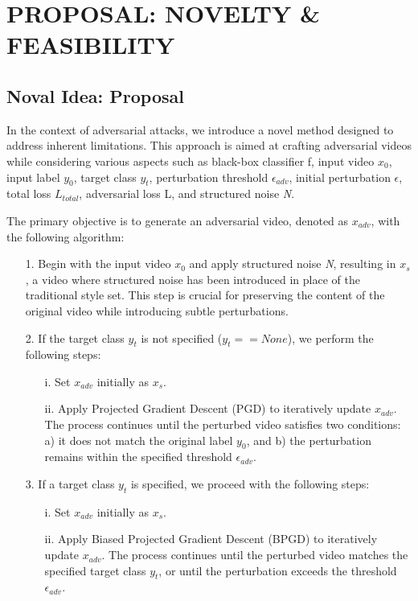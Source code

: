 \section {PROPOSAL: NOVELTY \& FEASIBILITY}

\subsection{Noval Idea: Proposal}
In the context of adversarial attacks, we introduce a novel method designed to address inherent limitations. This approach is aimed at crafting adversarial videos while considering various aspects such as black-box classifier f, input video $x_0$, input label $y_0$, target class $y_t$, perturbation threshold $\epsilon_{adv}$, initial perturbation $\epsilon$, total loss $L_{total}$, adversarial loss L, and structured noise \textit{N}.

The primary objective is to generate an adversarial video, denoted as $x_{adv}$, with the following algorithm:
\begin{itemize}
    \item[1.] Begin with the input video $x_0$ and apply structured noise \textit{N}, resulting in $x_s$, a video where structured noise has been introduced in place of the traditional style set. This step is crucial for preserving the content of the original video while introducing subtle perturbations.
    \item[2.] If the target class $y_t$ is not specified ($y_t == None$), we perform the following steps:
    \begin{itemize}
        \item[i.] Set $x_{adv}$ initially as $x_{s}$.
        \item[ii.] Apply Projected Gradient Descent (PGD) to iteratively update $x_{adv}$. The process continues until the perturbed video satisfies two conditions: a) it does not match the original label $y_0$, and b) the perturbation remains within the specified threshold $\epsilon_{adv}$. 
    \end{itemize}
    \item[3.] If a target class $y_t$ is specified, we proceed with the following steps:
    \begin{itemize}
        \item[i.] Set $x_{adv}$ initially as $x_s$.
        \item[ii.] Apply Biased Projected Gradient Descent (BPGD) to iteratively update $x_{adv}$. The process continues until the perturbed video matches the specified target class $y_t$, or until the perturbation exceeds the threshold $\epsilon_{adv}$.
    \end{itemize}
\end{itemize}


